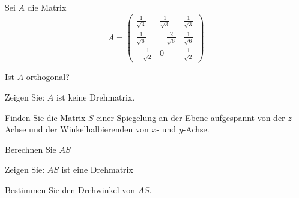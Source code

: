 Sei $A$ die Matrix
\[
A=\begin{pmatrix}
\frac1{\sqrt{3}}&\frac1{\sqrt{3}}&\frac1{\sqrt{3}}\\
\frac1{\sqrt{6}}&-\frac2{\sqrt{6}}&\frac1{\sqrt{6}}\\
-\frac1{\sqrt{2}}&0&\frac1{\sqrt{2}}
\end{pmatrix}
\]
\begin{teilaufgaben}
\item Ist $A$ orthogonal?
\item Zeigen Sie: $A$ ist keine Drehmatrix.
\item Finden Sie die Matrix $S$ einer Spiegelung an der
Ebene aufgespannt von der $z$-Achse und der Winkelhalbierenden
von $x$- und $y$-Achse.
\item Berechnen Sie $AS$
\item Zeigen Sie: $AS$ ist eine Drehmatrix
\item Bestimmen Sie den Drehwinkel von $AS$.
\end{teilaufgaben}


